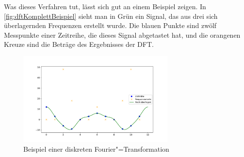 Was dieses Verfahren tut, lässt sich gut an einem Beispiel zeigen. In \autoref{fig:dftKomplettBeispiel} sieht man in Grün ein Signal, das aus drei sich überlagernden Frequenzen erstellt wurde. Die blauen Punkte sind zwölf Messpunkte einer Zeitreihe, die dieses Signal abgetastet hat, und die orangenen Kreuze sind die Beträge des Ergebnisses der \acs{DFT}. 
\begin{figure}[bth] 
  \centering
  \includegraphics[width=0.7\textwidth]{Graphics/DFTExample1.pdf}
  \caption{Beispiel einer diskreten Fourier"=Transformation}
  \label{fig:dftKomplettBeispiel}
\end{figure}

